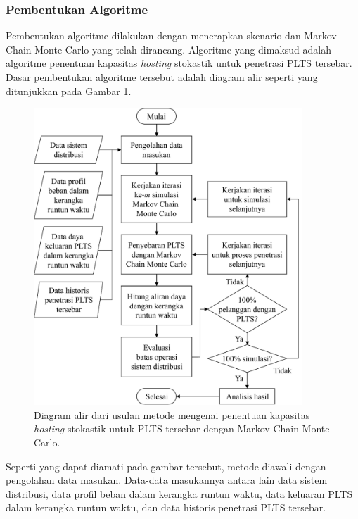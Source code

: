 \subsubsection{Pembentukan Algoritme}
Pembentukan algoritme dilakukan dengan menerapkan skenario dan Markov Chain Monte Carlo yang telah dirancang. Algoritme yang dimaksud adalah algoritme penentuan kapasitas \textit{\textit{hosting}} stokastik untuk penetrasi PLTS tersebar. Dasar pembentukan algoritme tersebut adalah diagram alir seperti yang ditunjukkan pada Gambar \ref{fcmcmc}.
\begin{figure}[!b]
	\centering
	\includegraphics[width=0.9\textwidth]{Fig/fcmcmc}
	\caption{Diagram alir dari usulan metode mengenai penentuan kapasitas \textit{\textit{hosting}} stokastik untuk PLTS tersebar dengan Markov Chain Monte Carlo.}
	\label{fcmcmc}
\end{figure}
Seperti yang dapat diamati pada gambar tersebut, metode diawali dengan pengolahan data masukan. Data-data masukannya antara lain data sistem distribusi, data profil beban dalam kerangka runtun waktu, data keluaran PLTS dalam kerangka runtun waktu, dan data historis penetrasi PLTS tersebar.

